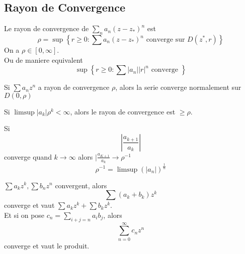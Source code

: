 \documentclass[../main.tex]{subfiles}
\begin{document}
\subsection{Rayon de Convergence}
\begin{defn}
	Le rayon de convergence de $ \sum_{n}^{ }a_n ( z-z_{\ast} ) ^{n}$ est 
	\[ 
		\rho = \sup \left\{ r \geq 0: \sum a_n ( z-z_{\ast} ) ^{n} \text{ converge sur } D( z^{*},r)  \right\} 
	\]
	On a $\rho \in [ 0, \infty ] $.\\
	Ou de maniere equivalent
	\[ 
	\sup \left\{ r \geq 0 : \sum |a_n||r|^{n} \text{ converge }  \right\}
	\]
	
\end{defn}
\begin{lemma}
	Si $\sum a_n z^{n}$ a rayon de convergence $\rho$, alors la serie converge normalement sur $D( 0,\rho) $ 
\end{lemma}
\begin{lemma}
Si $ \limsup  |a_k|\rho^{k}< \infty $, alors le rayon de convergence est $ \geq \rho$.
\end{lemma}
\begin{lemma}
Si
\[ 
| \frac{a_{k+1} }{a_k}|
\]
converge quand $k\to \infty $ alors $|\frac{a_{K+1} }{a_k}\to \rho^{-1}$ \\
\[ 
	\rho^{-1} = \limsup ( |a_n|) ^{\frac{1}{n}}
\]

\end{lemma}
\begin{lemma}
$\sum a_kz^{k}, \sum b_n z^{n}$ convergent, alors
\[ 
	\sum ( a_k+b_k) z^{k}
\]
converge et vaut $\sum a_k z^{k}+ \sum b_k z^{k}$.\\
Et si on pose $c_n = \sum_{i+j=n} a_i b_j$, alors
\[ 
\sum_{n=0}^{ \infty }c_n z^{n}
\]
converge et vaut le produit.

\end{lemma}
\end{document}
